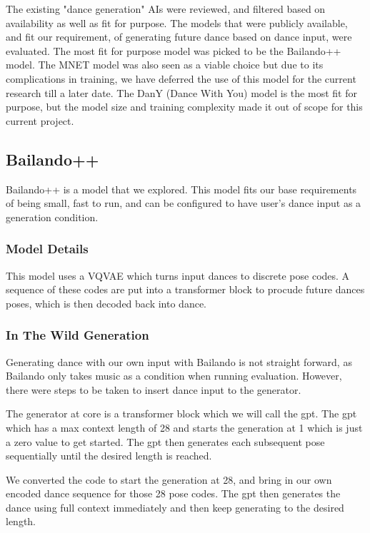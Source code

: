 \documentclass[final,5p,times,authoryear]{article}
\begin{document}
The existing "dance generation" AIs were reviewed, and filtered based on
availability as well as fit for purpose. The models that were publicly
available, and fit our requirement, of generating future dance based on dance
input, were evaluated. The most fit for purpose model was picked to be the
Bailando++ model. The MNET model was also seen as a viable choice but due to its
complications in training, we have deferred the use of this model for the
current research till a later date. The DanY (Dance With You) model is the most
fit for purpose, but the model size and training complexity made it out of scope
for this current project.

\subsection{Bailando++}

Bailando++ is a model that we explored. This model fits our base requirements of
being small, fast to run, and can be configured to have user's dance input as a
generation condition.

\subsubsection{Model Details}
This model uses a VQVAE which turns input dances to discrete pose codes. A
sequence of these codes are put into a transformer block to procude future
dances poses, which is then decoded back into dance.

\subsubsection{In The Wild Generation}
Generating dance with our own input with Bailando is not straight forward, as
Bailando only takes music as a condition when running evaluation. However, there
were steps to be taken to insert dance input to the generator.

The generator at core is a transformer block which we will call the gpt.
The gpt which has a max context length of 28 and starts the generation at 1
which is just a zero value to get started. The gpt then generates each
subsequent pose sequentially until the desired length is reached.

We converted the code to start the generation at 28, and bring in our own
encoded dance sequence for those 28 pose codes. The gpt then generates the dance
using full context immediately and then keep generating to the desired length.
\end{document}
